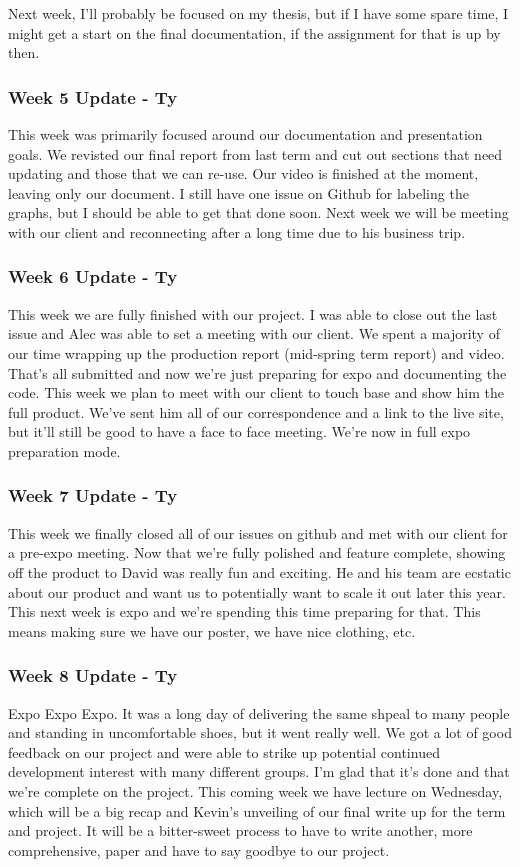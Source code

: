 Next week, I'll probably be focused on my thesis, but if I have some spare time, I might get a start on the final documentation, if the assignment for that is up by then.

\subsubsection{Week 5 Update - Ty}
This week was primarily focused around our documentation and presentation goals.
We revisted our final report from last term and cut out sections that need updating and those that we can re-use.
Our video is finished at the moment, leaving only our document.
I still have one issue on Github for labeling the graphs, but I should be able to get that done soon.
​Next week we will be meeting with our client and reconnecting after a long time due to his business trip.

\subsubsection{Week 6 Update - Ty}
This week we are fully finished with our project.
I was able to close out the last issue and Alec was able to set a meeting with our client.
We spent a majority of our time wrapping up the production report (mid-spring term report) and video.
That's all submitted and now we're just preparing for expo and documenting the code.
​This week we plan to meet with our client to touch base and show him the full product.
We've sent him all of our correspondence and a link to the live site, but it'll still be good to have a face to face meeting.
We're now in full expo preparation mode.

\subsubsection{Week 7 Update - Ty}
This week we finally closed all of our issues on github and met with our client for a pre-expo meeting.
Now that we're fully polished and feature complete, showing off the product to David was really fun and exciting.
He and his team are ecstatic about our product and want us to potentially want to scale it out later this year.
This next week is expo and we're spending this time preparing for that.
This means making sure we have our poster, we have nice clothing, etc. ​

\subsubsection{Week 8 Update - Ty}
Expo Expo Expo.
It was a long day of delivering the same shpeal to many people and standing in uncomfortable shoes, but it went really well.
We got a lot of good feedback on our project and were able to strike up potential continued development interest with many different groups.
I'm glad that it's done and that we're complete on the project.
This coming week we have lecture on Wednesday, which will be a big recap and Kevin's unveiling of our final write up for the term and project.
It will be a bitter-sweet process to have to write another, more comprehensive, paper and have to say goodbye to our project. ​​

